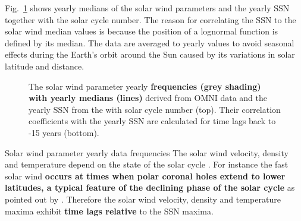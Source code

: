 Fig.~\ref{fig:OMNI_yearly_ssn_correlation_c_plot} shows yearly medians of the solar wind parameters and the yearly SSN together with the solar cycle number. The reason for correlating the SSN to the solar wind median values is because the position of a lognormal function is defined by its median. The data are averaged to yearly values to avoid seasonal effects during the Earth’s orbit around the Sun caused by its variations in solar latitude and distance.
\begin{figure}
	\caption{The solar wind parameter yearly \textbf{frequencies (grey shading) with yearly medians (lines)} derived from OMNI data and the yearly SSN from the \citet{sidc} with solar cycle number (top). Their correlation coefficients with the yearly SSN are calculated for time lags back to -15 years (bottom).}
	\label{fig:OMNI_yearly_ssn_correlation_c_plot}
\end{figure}
 Solar wind parameter yearly data frequencies
The solar wind velocity, density and temperature depend on the state of the solar cycle \citep{Schwenn1983}. %
For instance the fast solar wind \textbf{occurs at times when polar coronal holes extend to lower latitudes, a typical feature of the declining phase of the solar cycle} as pointed out by \citet[p.~75, Figure~3.52]{Bothmer2007}. Therefore the solar wind velocity, density and temperature maxima exhibit \textbf{time lags relative} to the SSN maxima.

